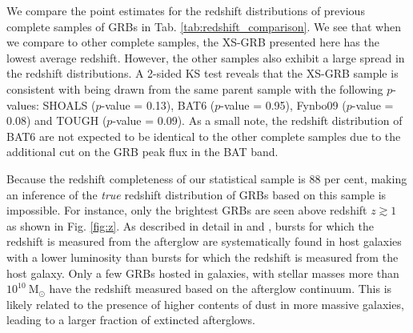 \documentclass[longauth]{aa}    %
\begin{document}
We compare the point estimates for the redshift distributions of previous
complete samples of GRBs in Tab. \ref{tab:redshift_comparison}. We see that when
we compare to other complete samples, the XS-GRB presented here has the lowest
average redshift. However, the other samples also exhibit a large spread in the
redshift distributions. A 2-sided KS test reveals that the XS-GRB sample is
consistent with being drawn from the same parent sample with the following
$p$-values: SHOALS ($p$-value = 0.13), BAT6 ($p$-value = 0.95), Fynbo09
($p$-value = 0.08) and TOUGH ($p$-value = 0.09). As a small note, the redshift
distribution of BAT6 are not expected to be identical to the other complete
samples due to the additional cut on the GRB peak flux in the BAT band.

Because the redshift completeness of our statistical sample is 88 per cent,
making an inference of the \textit{true} redshift distribution of GRBs based on
this sample is impossible. %
For instance, only the brightest GRBs are seen above redshift $z \gtrsim 1$ as
shown in Fig. \ref{fig:z}. As described in detail in \citet{Hjorth2012} and
\citet{Perley2016b}, bursts for which the redshift is measured from the
afterglow are systematically found in host galaxies with a lower luminosity
than bursts for which the redshift is measured from the host galaxy. Only a few
GRBs hosted in galaxies, with stellar masses more than
$10^{10}~\mathrm{M}_\odot$ have the redshift measured based on the afterglow
continuum. This is likely related to the presence of higher contents of dust in
more massive galaxies, leading to a larger fraction of extincted afterglows.
\end{document}
